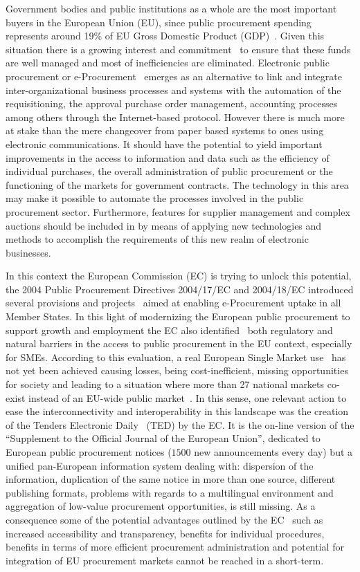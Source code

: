 Government bodies and public institutions as a whole are the most important buyers in the European Union (EU), since public procurement spending represents around 19\% of 
EU Gross Domestic Product (GDP)~\cite{d2010}. Given this situation there is a growing interest and commitment~\cite{d2010a} to ensure that these funds are 
well managed and most of inefficiencies are eliminated. Electronic public procurement or e-Procurement~\cite{Podlogar2007} emerges as an alternative to link and 
integrate inter-organizational business processes and systems with the automation of the requisitioning, the approval purchase order 
management, accounting processes among others through the Internet-based protocol.  However there is much more at stake than the mere changeover 
from paper based systems to ones using electronic communications. It should have the potential to yield important improvements in the access to information and data such as the efficiency of individual purchases, the overall administration of public procurement or the functioning of the markets for government contracts. 
The technology in this area may make it possible to automate the processes involved in the public procurement sector. Furthermore, features for supplier 
management and complex auctions should be included in by means of applying new technologies and methods to accomplish the requirements of this new realm of electronic businesses.

In this context the European Commission (EC) is trying to unlock this potential, the 2004 Public Procurement Directives 2004/17/EC and 2004/18/EC 
introduced several provisions and projects~\cite{peppol,e-certis} aimed at enabling e-Procurement uptake in all Member States. In this light of 
modernizing the European public procurement to support growth and employment the EC also identified~\cite{siemensEval} both regulatory and natural barriers in the access to 
public procurement in the EU context, especially for SMEs. According to this evaluation, a real European Single Market use~\cite{d2011} 
has not yet been achieved causing losses, being cost-inefficient, missing opportunities for society and leading to a 
situation where more than 27 national markets co-exist instead of an EU-wide public market~\cite{monti2010}. 
In this sense, one relevant action to ease the interconnectivity and interoperability in this landscape was the creation of the Tenders Electronic Daily~\cite{eNotices,formsTed} (TED) 
by the EC. It is the on-line version of the ``Supplement to the Official Journal of the European Union'', dedicated to European public procurement notices 
($1500$ new announcements every day) but a unified pan-European information system dealing with: dispersion of the information, 
duplication of the same notice in more than one source, different publishing formats, problems with regards to a multilingual environment and 
aggregation of low-value procurement opportunities, is still missing. As a consequence some of the potential advantages 
outlined by the EC~\cite{d2010} such as increased accessibility and transparency, benefits for individual procedures, 
benefits in terms of more efficient procurement administration and potential for integration of EU procurement markets cannot be reached in a 
short-term.

